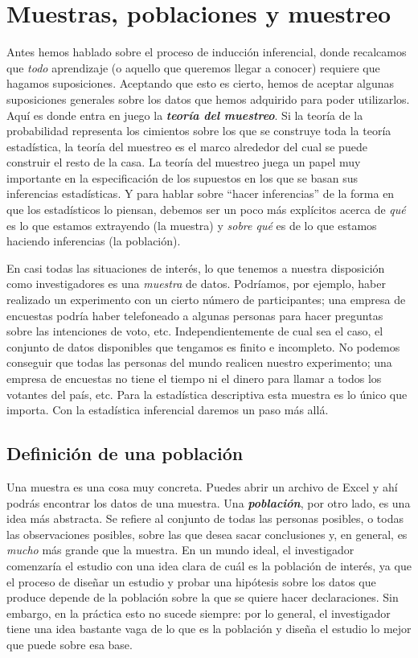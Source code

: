 \documentclass[spanish,]{book}
\begin{document}
\section{Muestras, poblaciones y muestreo}\label{srs}

Antes hemos hablado sobre el proceso de inducción inferencial, donde
recalcamos que \emph{todo} aprendizaje (o aquello que queremos llegar a
conocer) requiere que hagamos suposiciones. Aceptando que esto es
cierto, hemos de aceptar algunas suposiciones generales sobre los datos
que hemos adquirido para poder utilizarlos. Aquí es donde entra en juego
la \textbf{\emph{teoría del muestreo}}. Si la teoría de la probabilidad
representa los cimientos sobre los que se construye toda la teoría
estadística, la teoría del muestreo es el marco alrededor del cual se
puede construir el resto de la casa. La teoría del muestreo juega un
papel muy importante en la especificación de los supuestos en los que se
basan sus inferencias estadísticas. Y para hablar sobre ``hacer
inferencias'' de la forma en que los estadísticos lo piensan, debemos
ser un poco más explícitos acerca de \emph{qué} es lo que estamos
extrayendo (la muestra) y \emph{sobre qué} es de lo que estamos haciendo
inferencias (la población).

En casi todas las situaciones de interés, lo que tenemos a nuestra
disposición como investigadores es una \emph{muestra} de datos.
Podríamos, por ejemplo, haber realizado un experimento con un cierto
número de participantes; una empresa de encuestas podría haber
telefoneado a algunas personas para hacer preguntas sobre las
intenciones de voto, etc. Independientemente de cual sea el caso, el
conjunto de datos disponibles que tengamos es finito e incompleto. No
podemos conseguir que todas las personas del mundo realicen nuestro
experimento; una empresa de encuestas no tiene el tiempo ni el dinero
para llamar a todos los votantes del país, etc. Para la estadística
descriptiva esta muestra es lo único que importa. Con la estadística
inferencial daremos un paso más allá.

\subsection{Definición de una población}\label{pop}

Una muestra es una cosa muy concreta. Puedes abrir un archivo de Excel y
ahí podrás encontrar los datos de una muestra. Una
\textbf{\emph{población}}, por otro lado, es una idea más abstracta. Se
refiere al conjunto de todas las personas posibles, o todas las
observaciones posibles, sobre las que desea sacar conclusiones y, en
general, es \emph{mucho} más grande que la muestra. En un mundo ideal,
el investigador comenzaría el estudio con una idea clara de cuál es la
población de interés, ya que el proceso de diseñar un estudio y probar
una hipótesis sobre los datos que produce depende de la población sobre
la que se quiere hacer declaraciones. Sin embargo, en la práctica esto
no sucede siempre: por lo general, el investigador tiene una idea
bastante vaga de lo que es la población y diseña el estudio lo mejor que
puede sobre esa base.
\end{document}
